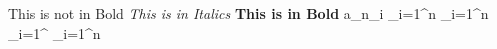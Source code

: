 \documentclass{article}
\begin{document}
This is not in Bold
\newline
\textit{This is in Italics}
\newline
\textbf{This is in Bold}
\newline
a_{n_i}
\newline
\newline
\int_{i=1}^n
\newline
\vspace{1cm}
\prod_{i=1}^n
\newline
\vspace{1cm}
\sum_{i=1}^{\infty}
\newline
\vspace{1cm}
\newline
\oint_{i=1}^n
\end{document}
